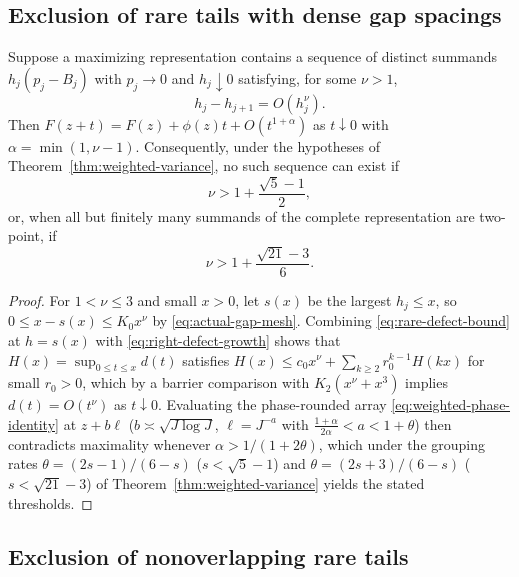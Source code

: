 \subsection{Exclusion of rare tails with dense gap spacings}

\begin{theorem}\label{thm:dense-rare-gaps}
Suppose a maximizing representation contains a sequence of distinct summands
$h_j(p_j-B_j)$ with $p_j\to0$ and $h_j\downarrow0$ satisfying, for some
$\nu>1$,
\begin{equation}\label{eq:actual-gap-mesh}
                 h_j-h_{j+1}=O(h_j^\nu).
\end{equation}
Then $F(z+t)=F(z)+\phi(z)t+O(t^{1+\alpha})$ as $t\downarrow0$ with
$\alpha=\min(1,\nu-1)$. Consequently, under the hypotheses of
Theorem~\ref{thm:weighted-variance}, no such sequence can exist if
\[
 \nu>1+\frac{\sqrt5-1}{2},
\]
or, when all but finitely many summands of the complete representation are
two-point, if
\[
 \nu>1+\frac{\sqrt{21}-3}{6}.
\]
\end{theorem}
\begin{proof}
For $1<\nu\le3$ and small $x>0$, let $s(x)$ be the largest $h_j\le x$, so
$0\le x-s(x)\le K_0x^\nu$ by \eqref{eq:actual-gap-mesh}. Combining
\eqref{eq:rare-defect-bound} at $h=s(x)$ with \eqref{eq:right-defect-growth}
shows that $H(x)=\sup_{0\le t\le x}d(t)$ satisfies
$H(x)\le c_0x^\nu+\sum_{k\ge2}r_0^{k-1}H(kx)$ for small $r_0>0$, which by a
barrier comparison with $K_2(x^\nu+x^3)$ implies $d(t)=O(t^\nu)$ as
$t\downarrow0$. Evaluating the phase-rounded array
\eqref{eq:weighted-phase-identity} at $z+b\ell$ ($b\asymp\sqrt{J\log J}$,
$\ell=J^{-a}$ with $\frac{1+\alpha}{2\alpha}<a<1+\theta$) then contradicts
maximality whenever $\alpha>1/(1+2\theta)$, which under the grouping rates
$\theta=(2s-1)/(6-s)$ ($s<\sqrt5-1$) and $\theta=(2s+3)/(6-s)$
($s<\sqrt{21}-3$) of Theorem~\ref{thm:weighted-variance} yields the stated
thresholds.
\end{proof}

\subsection{Exclusion of nonoverlapping rare tails}

